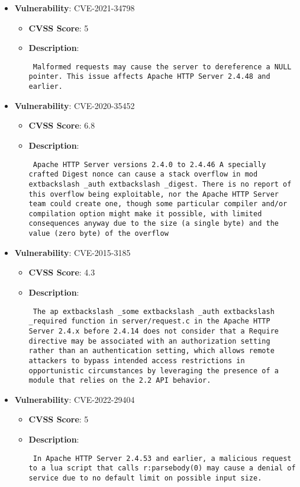 \documentclass{article}
\begin{document}
\begin{itemize}
        \item \textbf{Vulnerability}: CVE-2021-34798
        \begin{itemize}
            \item \textbf{CVSS Score}:  5 
            \item \textbf{Description}: \parbox{\linewidth}{\texttt{ Malformed requests may cause the server to dereference a NULL pointer. This issue affects Apache HTTP Server 2.4.48 and earlier. }}
        \end{itemize}
    
        \item \textbf{Vulnerability}: CVE-2020-35452
        \begin{itemize}
            \item \textbf{CVSS Score}:  6.8 
            \item \textbf{Description}: \parbox{\linewidth}{\texttt{ Apache HTTP Server versions 2.4.0 to 2.4.46 A specially crafted Digest nonce can cause a stack overflow in mod	extbackslash _auth	extbackslash _digest. There is no report of this overflow being exploitable, nor the Apache HTTP Server team could create one, though some particular compiler and/or compilation option might make it possible, with limited consequences anyway due to the size (a single byte) and the value (zero byte) of the overflow }}
        \end{itemize}
    
        \item \textbf{Vulnerability}: CVE-2015-3185
        \begin{itemize}
            \item \textbf{CVSS Score}:  4.3 
            \item \textbf{Description}: \parbox{\linewidth}{\texttt{ The ap	extbackslash _some	extbackslash _auth	extbackslash _required function in server/request.c in the Apache HTTP Server 2.4.x before 2.4.14 does not consider that a Require directive may be associated with an authorization setting rather than an authentication setting, which allows remote attackers to bypass intended access restrictions in opportunistic circumstances by leveraging the presence of a module that relies on the 2.2 API behavior. }}
        \end{itemize}
    
        \item \textbf{Vulnerability}: CVE-2022-29404
        \begin{itemize}
            \item \textbf{CVSS Score}:  5 
            \item \textbf{Description}: \parbox{\linewidth}{\texttt{ In Apache HTTP Server 2.4.53 and earlier, a malicious request to a lua script that calls r:parsebody(0) may cause a denial of service due to no default limit on possible input size. }}
        \end{itemize}
    

\end{itemize}
\end{document}
